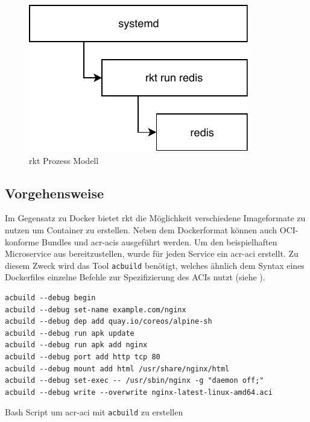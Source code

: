 \begin{figure}[h]
	\begin{center}
		\includegraphics[scale=0.9]{bilder/rkt-process.pdf}
		\caption{rkt Prozess Modell \citep{RktVsOtherProjects}}
		\label{fig:rktProcessModell}		
	\end{center}
\end{figure}


\subsection{Vorgehensweise}
\label{sec:compRktVorgehen}

Im Gegensatz zu Docker bietet rkt die Möglichkeit verschiedene Imageformate zu nutzen um Container zu erstellen. Neben dem Dockerformat können auch OCI-konforme Bundles und \glspl{acr-aci} ausgeführt werden. Um den beispielhaften Microservice aus  bereitzustellen, wurde für jeden Service ein \gls{acr-aci} erstellt. Zu diesem Zweck wird das Tool \texttt{acbuild} benötigt, welches ähnlich dem Syntax eines Dockerfiles einzelne Befehle zur Spezifizierung des ACIs nutzt (siehe ).

\begin{listing}[h]
	\begin{verbatim}
acbuild --debug begin
acbuild --debug set-name example.com/nginx
acbuild --debug dep add quay.io/coreos/alpine-sh
acbuild --debug run apk update
acbuild --debug run apk add nginx
acbuild --debug port add http tcp 80
acbuild --debug mount add html /usr/share/nginx/html
acbuild --debug set-exec -- /usr/sbin/nginx -g "daemon off;"
acbuild --debug write --overwrite nginx-latest-linux-amd64.aci
	\end{verbatim}
	\caption{Bash Script um \gls{acr-aci} mit \texttt{acbuild} zu erstellen \citep{AppContainer}}
	\label{lst:acbuildCommands}
\end{listing}

